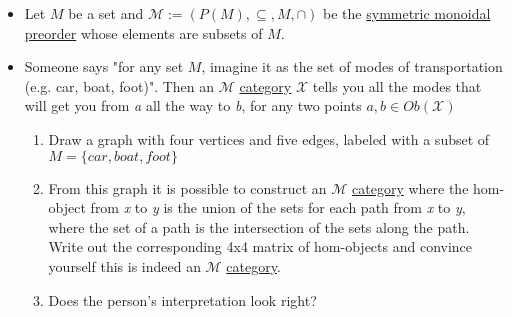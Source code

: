 \begin{itemize}
    \item Let $M$ be a set and $\mathcal{M}:=(P(M),\subseteq, M, \cap)$ be the \hyperref[D2.2]{symmetric monoidal preorder} whose elements are subsets of $M$.
    \item Someone says "for any set $M$, imagine it as the set of modes of transportation (e.g. car, boat, foot)". Then an $\mathcal{M}$ \hyperref[D2.46]{category} $\mathcal{X}$ tells you all the modes that will get you from \emph{a} all the way to \emph{b}, for any two points $a,b \in Ob(\mathcal{X})$
          \begin{enumerate}
            \item Draw a graph with four vertices and five edges, labeled with a subset of $M=\{car,boat,foot\}$
            \item From this graph it is possible to construct an $\mathcal{M}$ \hyperref[D2.46]{category} where the hom-object from \emph{x} to \emph{y} is the union of the sets for each path from \emph{x} to \emph{y}, where the set of a path is the intersection of the sets along the path. Write out the corresponding 4x4 matrix of hom-objects and convince yourself this is indeed an $\mathcal{M}$ \hyperref[D2.46]{category}.
            \item Does the person's interpretation look right?
          \end{enumerate}
  \end{itemize}